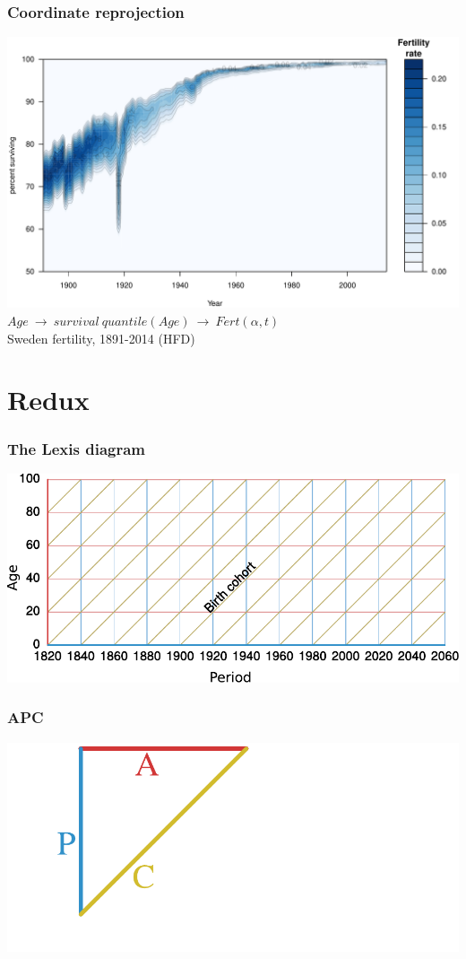 \documentclass[20pt]{beamer}
\begin{document}
\begin{frame}
\frametitle{Coordinate reprojection}
\includegraphics[scale=.9]{Figures/FertQuant.pdf}\\
$Age~\rightarrow~survival~quantile(Age)~\rightarrow~Fert(\alpha,t)$\\
Sweden fertility, 1891-2014 (HFD)
\end{frame}

\section{Redux}
\begin{frame}
\frametitle{The Lexis diagram}
\includegraphics[scale=1.5]{Figures/LexisStripped0.pdf}\\
\end{frame}

\begin{frame}
\frametitle{APC}
\includegraphics[scale=1.5]{Figures/LexisStripped1.pdf}\\
\end{frame}
\end{document}
